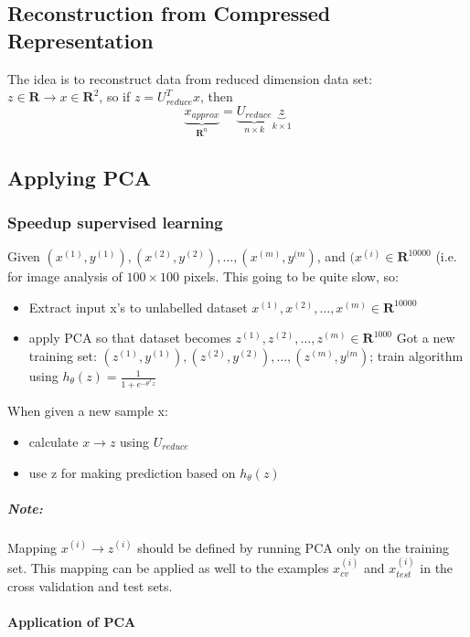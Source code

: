 \documentclass{scrartcl}
\begin{document}
\subsection{Reconstruction from Compressed Representation}
\label{sec:14-6}

The idea is to reconstruct data from reduced dimension data set: $z
\in \mathbf{R} \rightarrow x \in \mathbf{R}^2$, so if $z =
U^T_{reduce} x$, then \[ \underbrace{x_{approx}}_{\mathbf{R}^n} =
\underbrace{U_{reduce}}_{n \times k} \underbrace{z}_{k \times 1} \]

\subsection{Applying PCA}
\label{sec:14-7}

\subsubsection{Speedup supervised learning}
\label{sec:14-7-1}

Given $(x^{(1)}, y^{(1)}),(x^{(2)}, y^{(2)}),\dots, (x^{(m)},
y^{(m})$, and $(x^{(i)} \in \mathbf{R}^{10000}$ (i.e. for image
analysis of $100 \times 100$ pixels. This going to be quite slow, so:
\begin{itemize}
\item Extract input x's to unlabelled dataset $x^{(1)},x^{(2)},\dots,
  x^{(m)} \in \mathbf{R}^{10000}$
\item apply PCA so that dataset becomes $z^{(1)},z^{(2)},\dots,
  z^{(m)} \in \mathbf{R}^{1000}$ Got a new training set: $(z^{(1)},
  y^{(1)}),(z^{(2)}, y^{(2)}),\dots, (z^{(m)}, y^{(m})$; train
  algorithm using $h_\theta(z) = \frac{1}{1 + e^{-\theta^Tz}}$
\end{itemize}

When given a new sample x:
\begin{itemize}
\item calculate $x \rightarrow z$ using $U_{reduce}$
\item use z for making prediction based on $h_\theta(z)$
\end{itemize}

\subparagraph{Note:} Mapping $x^{(i)} \rightarrow z^{(i)}$ should be
defined by running PCA only on the training set. This mapping can be
applied as well to the examples $x_{cv}^{(i)}$ and $x_{test}^{(i)}$ in
the cross validation and test sets.

\paragraph{Application of PCA}
\end{document}
